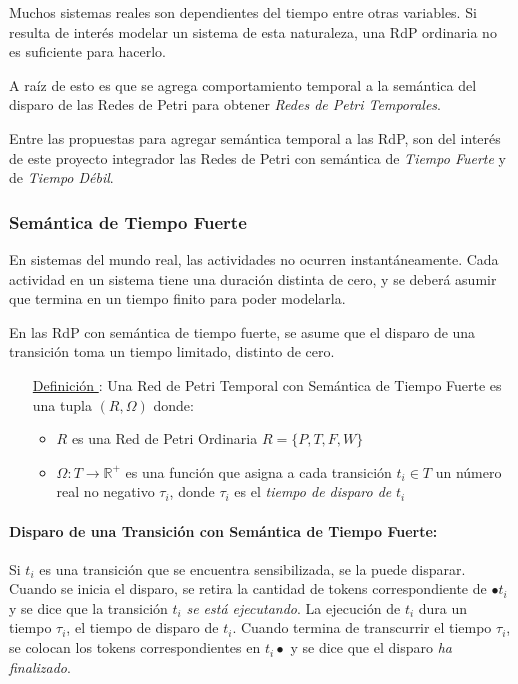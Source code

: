 Muchos sistemas reales son dependientes del tiempo entre otras variables. Si
resulta de interés modelar un sistema de esta naturaleza, una RdP ordinaria no
es suficiente para hacerlo.

A raíz de esto es que se agrega comportamiento temporal a la semántica del
disparo de las Redes de Petri para obtener \textit{Redes de Petri Temporales}.

Entre las propuestas para agregar semántica temporal a las RdP, son del interés
de este proyecto integrador las Redes de Petri con semántica de \textit{Tiempo
Fuerte} y de \textit{Tiempo Débil}.

\subsubsection{Semántica de Tiempo Fuerte}

En sistemas del mundo real, las actividades no ocurren instantáneamente. Cada
actividad en un sistema tiene una duración distinta de cero, y se deberá asumir
que termina en un tiempo finito para poder modelarla.
\cite{Ramchandani:1974:AAC:889750}

En las RdP con semántica de tiempo fuerte, se asume que el disparo de una
transición toma un tiempo limitado, distinto de cero.

\begin{itemize}
  \item [\underline{Definición \thedefinitionsCounter}:] Una Red de Petri Temporal con Semántica de
  Tiempo Fuerte es una tupla $(R, \Omega)$ donde:
  \begin{itemize}
    \item $R$ es una Red de Petri Ordinaria $R = \{P, T, F, W \}$
    \item $\Omega: T \rightarrow \mathbb{R^{+}}$ es una función que asigna
    a cada transición $t_{i} \in T$ un número real no negativo $\tau_{i}$,
    donde $\tau_{i}$ es el \textit{tiempo de disparo de} $t_{i}$
  \end{itemize}
\end{itemize}

\paragraph{Disparo de una Transición con Semántica de Tiempo Fuerte:}

Si $t_{i}$ es una transición que se encuentra sensibilizada, se la puede
disparar. Cuando se inicia el disparo, se retira la cantidad de tokens
correspondiente de $\bullet t_{i}$ y se dice que la transición $t_{i}$
\textit{se está ejecutando}.
La ejecución de $t_{i}$ dura un tiempo $\tau_{i}$, el tiempo de disparo de
$t_{i}$.
Cuando termina de transcurrir el tiempo $\tau_{i}$, se colocan los tokens
correspondientes en $t_{i} \bullet$ y se dice que el disparo \textit{ha
finalizado}.

